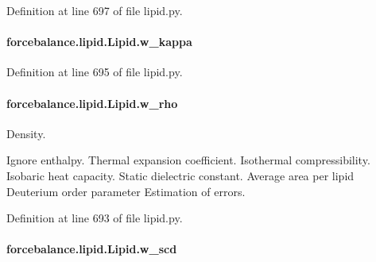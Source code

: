 Definition at line 697 of file lipid.\-py.

\hypertarget{classforcebalance_1_1lipid_1_1Lipid_a3d7a1134b742778f6d5e4023b4d4a414}{
\paragraph[{w\-\_\-kappa}]{\setlength{\rightskip}{0pt plus 5cm}forcebalance.\-lipid.\-Lipid.\-w\-\_\-kappa\hspace{0.3cm}{\ttfamily [inherited]}}}\label{classforcebalance_1_1lipid_1_1Lipid_a3d7a1134b742778f6d5e4023b4d4a414}


Definition at line 695 of file lipid.\-py.

\hypertarget{classforcebalance_1_1lipid_1_1Lipid_aeda7b6f1accd80386a1a50fdb90ff318}{
\paragraph[{w\-\_\-rho}]{\setlength{\rightskip}{0pt plus 5cm}forcebalance.\-lipid.\-Lipid.\-w\-\_\-rho\hspace{0.3cm}{\ttfamily [inherited]}}}\label{classforcebalance_1_1lipid_1_1Lipid_aeda7b6f1accd80386a1a50fdb90ff318}


Density. 

Ignore enthalpy. Thermal expansion coefficient. Isothermal compressibility. Isobaric heat capacity. Static dielectric constant. Average area per lipid Deuterium order parameter Estimation of errors. 

Definition at line 693 of file lipid.\-py.

\hypertarget{classforcebalance_1_1lipid_1_1Lipid_a6f9b743f37d3e891a9815b6bc1e1e475}{
\paragraph[{w\-\_\-scd}]{\setlength{\rightskip}{0pt plus 5cm}forcebalance.\-lipid.\-Lipid.\-w\-\_\-scd\hspace{0.3cm}{\ttfamily [inherited]}}}\label{classforcebalance_1_1lipid_1_1Lipid_a6f9b743f37d3e891a9815b6bc1e1e475}


